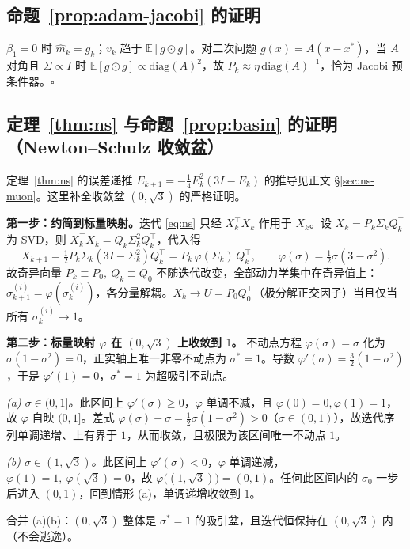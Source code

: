 \subsection{命题~\ref{prop:adam-jacobi} 的证明}

$\beta_1 = 0$ 时 $\hat m_k = g_k$；$v_k$ 趋于 $\mathbb{E}[g \odot g]$。对二次问题 $g(x) = A(x - x^*)$，当 $A$ 对角且 $\Sigma \propto I$ 时 $\mathbb{E}[g \odot g]\propto \mathrm{diag}(A)^2$，故 $P_k \approx \eta\,\mathrm{diag}(A)^{-1}$，恰为 Jacobi 预条件器。$\square$

\subsection{定理~\ref{thm:ns} 与命题~\ref{prop:basin} 的证明（Newton--Schulz 收敛盆）}

定理~\ref{thm:ns} 的误差递推 $E_{k+1}=-\tfrac14 E_k^2(3I-E_k)$ 的推导见正文 \S\ref{sec:ns-muon}。这里补全收敛盆 $(0,\sqrt3)$ 的严格证明。

\textbf{第一步：约简到标量映射。}\quad 迭代 \eqref{eq:ns} 只经 $X_k^\top X_k$ 作用于 $X_k$。设 $X_k=P_k\Sigma_k Q_k^\top$ 为 SVD，则 $X_k^\top X_k=Q_k\Sigma_k^2 Q_k^\top$，代入得
\[
  X_{k+1}=\tfrac12 P_k\Sigma_k(3I-\Sigma_k^2)Q_k^\top=P_k\,\varphi(\Sigma_k)\,Q_k^\top,
  \qquad \varphi(\sigma)=\tfrac12\sigma(3-\sigma^2).
\]
故奇异向量 $P_k\equiv P_0,\ Q_k\equiv Q_0$ 不随迭代改变，全部动力学集中在奇异值上：$\sigma^{(i)}_{k+1}=\varphi(\sigma^{(i)}_k)$，各分量解耦。$X_k\to U=P_0 Q_0^\top$（极分解正交因子）当且仅当所有 $\sigma^{(i)}_k\to1$。

\textbf{第二步：标量映射 $\varphi$ 在 $(0,\sqrt3)$ 上收敛到 $1$。}\quad
不动点方程 $\varphi(\sigma)=\sigma$ 化为 $\sigma(1-\sigma^2)=0$，正实轴上唯一非零不动点为 $\sigma^*=1$。导数 $\varphi'(\sigma)=\tfrac32(1-\sigma^2)$，于是 $\varphi'(1)=0$，$\sigma^*=1$ 为超吸引不动点。

\emph{(a) $\sigma\in(0,1]$。}\quad 此区间上 $\varphi'(\sigma)\ge0$，$\varphi$ 单调不减，且 $\varphi(0)=0,\varphi(1)=1$，故 $\varphi$ 自映 $(0,1]$。差式 $\varphi(\sigma)-\sigma=\tfrac12\sigma(1-\sigma^2)>0$（$\sigma\in(0,1)$），故迭代序列单调递增、上有界于 $1$，从而收敛，且极限为该区间唯一不动点 $1$。

\emph{(b) $\sigma\in(1,\sqrt3)$。}\quad 此区间上 $\varphi'(\sigma)<0$，$\varphi$ 单调递减，$\varphi(1)=1,\ \varphi(\sqrt3)=0$，故 $\varphi\bigl((1,\sqrt3)\bigr)=(0,1)$。任何此区间内的 $\sigma_0$ 一步后进入 $(0,1)$，回到情形 (a)，单调递增收敛到 $1$。

合并 (a)(b)：$(0,\sqrt3)$ 整体是 $\sigma^*=1$ 的吸引盆，且迭代恒保持在 $(0,\sqrt3)$ 内（不会逃逸）。

